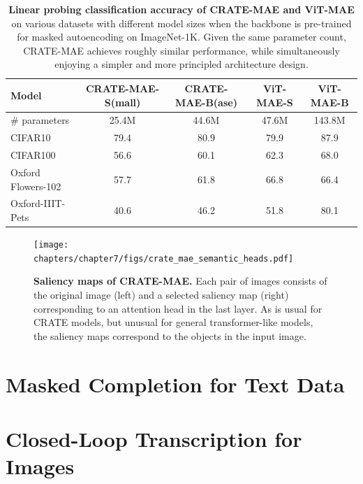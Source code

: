 \documentclass[../../book-main.tex]{subfiles}
\begin{document}
\begin{table}
    \centering 
    \begin{tabular}{@{}lcc|cc@{}}
        \toprule 
        \textbf{Model} & CRATE-MAE-S(mall) & CRATE-MAE-B(ase) & {\color{gray} ViT-MAE-S} & {\color{gray} ViT-MAE-B} \\
        \midrule
        \midrule
        \# parameters & 25.4M & 44.6M & 47.6M & {\color{gray}143.8M} \\
        \midrule
        CIFAR10 & 79.4 & 80.9 & {\color{gray} 79.9} & {\color{gray} 87.9} \\
        CIFAR100 & 56.6 & 60.1 & {\color{gray} 62.3} & {\color{gray} 68.0} \\
        Oxford Flowers-102 & 57.7 & 61.8 & {\color{gray} 66.8} & {\color{gray} 66.4} \\
        Oxford-IIIT-Pets & 40.6 & 46.2 & {\color{gray} 51.8} & {\color{gray} 80.1} \\
        \bottomrule
    \end{tabular}
    \caption{\small\textbf{Linear probing classification accuracy of CRATE-MAE and ViT-MAE} on various datasets with different model sizes when the backbone is pre-trained for masked autoencoding on ImageNet-1K. Given the same parameter count, CRATE-MAE achieves roughly similar performance, while simultaneously enjoying a simpler and more principled architecture design.}
    \label{tab:crate_mae_linear_probing}
\end{table}

\begin{figure}
    \centering 
    \texttt{[image: chapters/chapter7/figs/crate\_mae\_semantic\_heads.pdf]}
    \caption{\small\textbf{Saliency maps of CRATE-MAE.} Each pair of images consists of the original image (left) and a selected saliency map (right) corresponding to an attention head in the last layer. As is usual for CRATE models, but unusual for general transformer-like models, the saliency maps correspond to the objects in the input image.}
    \label{fig:crate_mae_semantic_heads}
\end{figure}

\section{Masked Completion for Text Data}\label{sec:text_completion}

\section{Closed-Loop Transcription for Images}\label{sec:ctrl}
\end{document}
